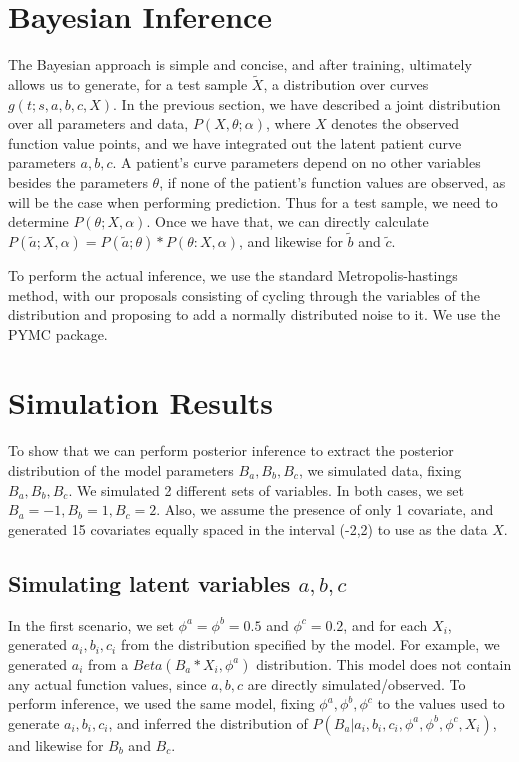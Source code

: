 \section{Bayesian Inference}
The Bayesian approach \cite{gelman}is simple and concise, and after training, ultimately allows us to generate, for a test sample $\tilde{X}$, a distribution over curves $g(t;s,a,b,c,X)$.  In the previous section, we have described a joint distribution over all parameters and data, $P(X,\theta;\alpha)$, where $X$ denotes the observed function value points, and we have integrated out the latent patient curve parameters $a,b,c$.  A patient's curve parameters depend on no other variables besides the parameters $\theta$, if none of the patient's function values are observed, as will be the case when performing prediction.  Thus for a test sample, we need to determine $P(\theta;X,\alpha)$.  Once we have that, we can directly calculate $P(\tilde{a};X,\alpha)=P(\tilde{a};\theta)*P(\theta:X,\alpha)$, and likewise for $\tilde{b}$ and $\tilde{c}$.

To perform the actual inference, we use the standard Metropolis-hastings method\cite{metro}, with our proposals consisting of cycling through the variables of the distribution and proposing to add a normally distributed noise to it.  We use the PYMC package.

\section{Simulation Results}

To show that we can perform posterior inference to extract the posterior distribution of the model parameters $B_a, B_b, B_c$, we simulated data, fixing $B_a, B_b, B_c$.  We simulated 2 different sets of variables.  In both cases, we set $B_a=-1, B_b=1, B_c=2$.  Also, we assume the presence of only 1 covariate, and generated 15 covariates equally spaced in the interval (-2,2) to use as the data $X$.

\subsection{Simulating latent variables $a, b, c$}
In the first scenario, we set $\phi^a=\phi^b=0.5$ and $\phi^c=0.2$, and for each $X_i$, generated $a_i, b_i, c_i$ from the distribution specified by the model.  For example, we generated $a_i$ from a $Beta(B_a*X_i, \phi^a)$ distribution.  This model does not contain any actual function values, since $a,b,c$ are directly simulated/observed.  To perform inference, we used the same model, fixing $\phi^a,\phi^b,\phi^c$ to the values used to generate $a_i,b_i,c_i$, and inferred the distribution of $P(B_a|a_i,b_i,c_i,\phi^a,\phi^b,\phi^c,X_i)$, and likewise for $B_b$ and $B_c$.

